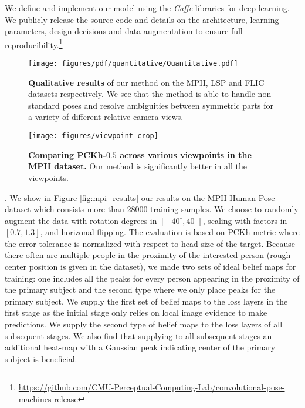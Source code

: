 \documentclass[10pt,twocolumn,letterpaper]{article}
\begin{document}
We define and implement our model using the \emph{Caffe}\cite{jia2014caffe} libraries for deep learning. We publicly release the source code and details on the architecture, learning parameters, design decisions and data augmentation to ensure full reproducibility.\footnote{\url{https://github.com/CMU-Perceptual-Computing-Lab/convolutional-pose-machines-release}}\begin{figure*}[ht!]
    \centering
    \texttt{[image: figures/pdf/quantitative/Quantitative.pdf]}
    \vspace{-5pt}
    \caption{\textbf{Qualitative results} of our method on the MPII, LSP and FLIC datasets respectively.  We see that the method is able to handle non-standard poses and resolve ambiguities between symmetric parts for a variety of different relative camera views.}
    \label{fig:leeds_qualitative}
\end{figure*}\begin{figure}[ht!]
    \centering
    \texttt{[image: figures/viewpoint-crop]}
    \vspace{-10pt}
    \caption{\textbf{Comparing PCKh-$0.5$ across various viewpoints in the MPII dataset.} Our method is significantly better in all the viewpoints.}
    \label{fig:mpi_vp}
\end{figure}. We show in Figure \ref{fig:mpi_results} our results on the MPII Human Pose dataset \cite{andriluka14cvpr} which consists more than 28000 training samples. 
We choose to randomly augment the data with rotation degrees in $[-40^{\circ},40^{\circ}]$, scaling with factors in $[0.7,1.3]$, and horizonal flipping.
The evaluation is based on PCKh metric \cite{andriluka14cvpr} where the error tolerance is normalized with respect to head size of the target. Because there often are multiple people in the proximity of the interested person (rough center position is given in the dataset), we made two sets of ideal belief maps for training: 
one includes all the peaks for every person appearing in the proximity of the primary subject and the second type where we only place peaks for the primary subject.  We supply the first set of belief maps to the loss layers in the first stage as the initial stage only relies on local image evidence to make predictions. We supply the second type of belief maps to the loss layers of all subsequent stages.
We also find that supplying to all subsequent stages an additional heat-map with a Gaussian peak indicating center of the primary subject is beneficial.
\end{document}
